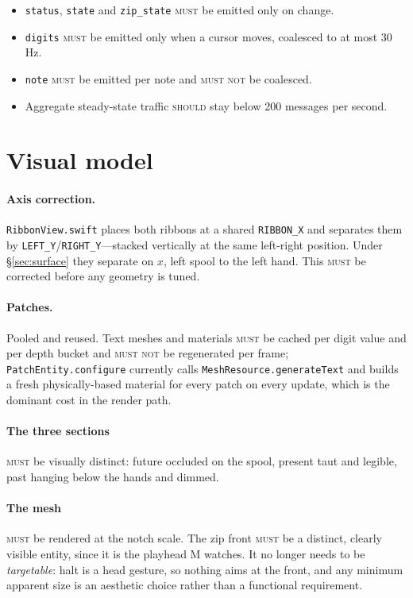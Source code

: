 \documentclass[11pt,a4paper]{article}
\newcommand{\MUST}{\textsc{must}}
\newcommand{\MUSTNOT}{\textsc{must not}}
\newcommand{\SHOULD}{\textsc{should}}
\theoremstyle{definition}
\theoremstyle{plain}
\theoremstyle{remark}
\begin{document}
\begin{itemize}[leftmargin=*]
\item \texttt{status}, \texttt{state} and \texttt{zip\_state} \MUST{} be emitted only on change.
\item \texttt{digits} \MUST{} be emitted only when a cursor moves, coalesced to at most 30\,Hz.
\item \texttt{note} \MUST{} be emitted per note and \MUSTNOT{} be coalesced.
\item Aggregate steady-state traffic \SHOULD{} stay below 200 messages per second.
\end{itemize}

\section{Visual model}

\paragraph{Axis correction.} \texttt{RibbonView.swift} places both ribbons at a shared
\texttt{RIBBON\_X} and separates them by \texttt{LEFT\_Y}/\texttt{RIGHT\_Y}---stacked vertically at
the same left-right position. Under \S\ref{sec:surface} they separate on \textbf{$x$}, left spool
to the left hand. This \MUST{} be corrected before any geometry is tuned.

\paragraph{Patches.} Pooled and reused. Text meshes and materials \MUST{} be cached per digit value
and per depth bucket and \MUSTNOT{} be regenerated per frame; \texttt{PatchEntity.configure}
currently calls \texttt{MeshResource.generateText} and builds a fresh physically-based material for
every patch on every update, which is the dominant cost in the render path.

\paragraph{The three sections} \MUST{} be visually distinct: future occluded on the spool, present
taut and legible, past hanging below the hands and dimmed.

\paragraph{The mesh} \MUST{} be rendered at the notch scale. The zip front \MUST{} be a distinct,
clearly visible entity, since it is the playhead M watches. It no longer needs to be
\emph{targetable}: halt is a head gesture, so nothing aims at the front, and any minimum apparent
size is an aesthetic choice rather than a functional requirement.
\end{document}
